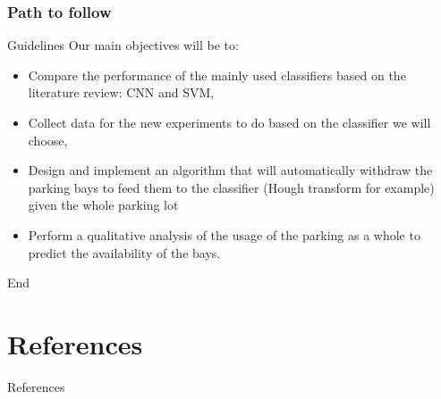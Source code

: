 \documentclass{beamer}
\begin{document}
\begin{frame}
\frametitle{Path to follow}
\begin{block}{Guidelines}
Our main objectives will be to:
\begin{itemize}
\item Compare the performance of the mainly used classifiers based on the literature review: CNN and SVM,
\item Collect data for the new experiments to do based on the classifier we will choose,
\item Design and implement an algorithm that will automatically withdraw the parking bays to feed them to the classifier (Hough transform for example) given the whole parking lot
\item Perform a qualitative analysis of the usage of the parking as a whole to predict the availability of the bays.

\end{itemize}

\end{block}
\end{frame}


\begin{frame}
\Huge{\centerline{End}}
\end{frame}


\section{References}
\begin{frame}[allowframebreaks]{References}%
\footnotesize{

}
\end{frame}
\end{document}
